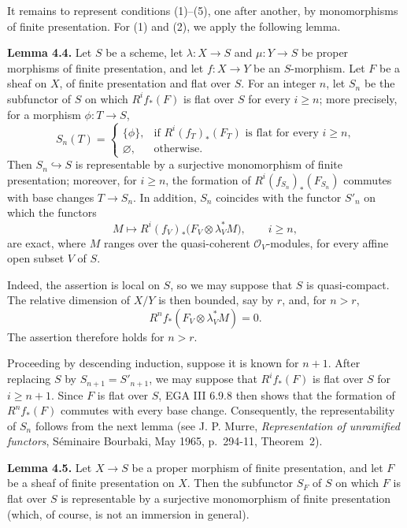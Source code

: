 It remains to represent conditions (1)--(5), one after another, by
monomorphisms of finite presentation. For (1) and (2), we apply the following
lemma.

\textbf{Lemma 4.4.} Let \(S\) be a scheme, let
\(\lambda:X\to S\) and \(\mu:Y\to S\) be proper morphisms of finite
presentation, and let \(f:X\to Y\) be an \(S\)-morphism. Let \(F\) be a
sheaf on \(X\), of finite presentation and flat over \(S\). For an integer
\(n\), let \(S_n\) be the subfunctor of \(S\) on which \(R^if_*(F)\) is
flat over \(S\) for every \(i\geq n\); more precisely, for a morphism
\(\phi:T\to S\),
\[
  S_n(T)=
  \begin{cases}
    \{\phi\},&\text{if \(R^i(f_T)_*(F_T)\) is flat for every \(i\geq n\),}\\
    \varnothing,&\text{otherwise.}
  \end{cases}
\]
Then \(S_n\hookrightarrow S\) is representable by a surjective monomorphism
of finite presentation; moreover, for \(i\geq n\), the formation of
\(R^i(f_{S_n})_*(F_{S_n})\) commutes with base changes \(T\to S_n\). In
addition, \(S_n\) coincides with the functor \(S'_n\) on which the functors
\[
  M\longmapsto
  R^i(f_V)_*\bigl(F_V\otimes\lambda_V^*M\bigr),
  \qquad i\geq n,
\]
are exact, where \(M\) ranges over the quasi-coherent
\(\mathcal O_V\)-modules, for every affine open subset \(V\) of \(S\).

Indeed, the assertion is local on \(S\), so we may suppose that \(S\) is
quasi-compact. The relative dimension of \(X/Y\) is then bounded, say by
\(r\), and, for \(n>r\),
\[
  R^nf_*(F_V\otimes\lambda_V^*M)=0.
\]
The assertion therefore holds for \(n>r\).

\newpage
Proceeding by descending induction, suppose it is known for \(n+1\). After
replacing \(S\) by \(S_{n+1}=S'_{n+1}\), we may suppose that
\(R^if_*(F)\) is flat over \(S\) for \(i\geq n+1\). Since \(F\) is flat
over \(S\), EGA III 6.9.8 then shows that the formation of \(R^nf_*(F)\)
commutes with every base change. Consequently, the representability of
\(S_n\) follows from the next lemma (see J. P. Murre,
\emph{Representation of unramified functors}, S\'eminaire Bourbaki, May
1965, p.~294-11, Theorem~2).

\textbf{Lemma 4.5.} Let \(X\to S\) be a proper morphism of finite
presentation, and let \(F\) be a sheaf of finite presentation on \(X\). Then
the subfunctor \(S_F\) of \(S\) on which \(F\) is flat over \(S\) is
representable by a surjective monomorphism of finite presentation (which, of
course, is not an immersion in general).

